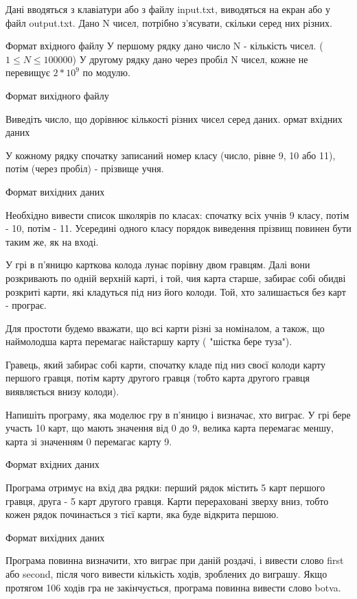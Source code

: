 \documentclass[]{article}
\begin{document}
Дані вводяться з клавіатури або з файлу input.txt, виводяться на екран або у файл output.txt.
 Дано N чисел, потрібно з'ясувати, скільки серед них різних.

Формат вхідного файлу
У першому рядку дано число N - кількість чисел. ($1 \le N \le 100000$)
У другому рядку дано через пробіл N чисел, кожне не перевищує $2 * 10^9$ по модулю.


Формат вихідного файлу

Виведіть число, що дорівнює кількості різних чисел серед даних.
ормат вхідних даних

У кожному рядку спочатку записаний номер класу (число, рівне 9, 10 або 11), потім (через пробіл) - прізвище учня.

Формат вихідних даних

Необхідно вивести список школярів по класах: спочатку всіх учнів 9 класу, потім - 10, потім - 11. Усередині одного класу порядок виведення прізвищ повинен бути таким же, як на вході.

У грі в п'яницю карткова колода лунає порівну двом гравцям. Далі вони розкривають по одній верхній карті, і той, чия карта старше, забирає собі обидві розкриті карти, які кладуться під низ його колоди. Той, хто залишається без карт - програє.

Для простоти будемо вважати, що всі карти різні за номіналом, а також, що наймолодша карта перемагає найстаршу карту ( "шістка бере туза").

Гравець, який забирає собі карти, спочатку кладе під низ своєї колоди карту першого гравця, потім карту другого гравця (тобто карта другого гравця виявляється внизу колоди).

Напишіть програму, яка моделює гру в п'яницю і визначає, хто виграє. У грі бере участь 10 карт, що мають значення від 0 до 9, велика карта перемагає меншу, карта зі значенням 0 перемагає карту 9.

Формат вхідних даних

Програма отримує на вхід два рядки: перший рядок містить 5 карт першого гравця, друга - 5 карт другого гравця. Карти перераховані зверху вниз, тобто кожен рядок починається з тієї карти, яка буде відкрита першою.

Формат вихідних даних

Програма повинна визначити, хто виграє при даній роздачі, і вивести слово first або second, після чого вивести кількість ходів, зроблених до виграшу. Якщо протягом 106 ходів гра не закінчується, програма повинна вивести слово botva.
\end{document}
